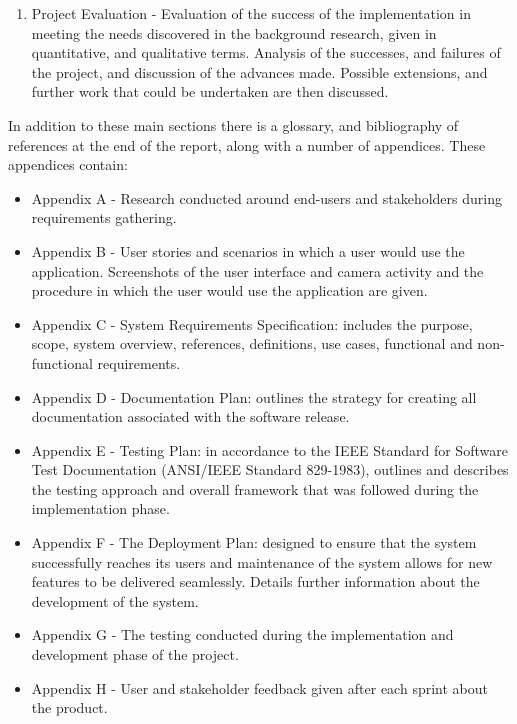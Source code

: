 \begin{enumerate}
	\item Project Evaluation - Evaluation of the success of the implementation in meeting the needs discovered in the background research, given in quantitative, and qualitative terms. Analysis of the successes, and failures of the project, and discussion of the advances made. Possible extensions, and further work that could be undertaken are then discussed.
\end{enumerate}

In addition to these main sections there is a glossary, and bibliography of references at the end of the report, along with a number of appendices. These appendices contain:

\begin{itemize}
	\item Appendix A - Research conducted around end-users and stakeholders during requirements gathering.
	\item Appendix B - User stories and scenarios in which a user would use the application. Screenshots of the user interface and camera activity and the procedure in which the user would use the application are given.
	\item Appendix C - System Requirements Specification: includes the purpose, scope, system overview, references, definitions, use cases, functional and non-functional requirements.
	\item Appendix D - Documentation Plan: outlines the strategy for creating all documentation associated with the software release.
	\item Appendix E - Testing Plan: in accordance to the IEEE Standard for Software Test Documentation (ANSI/IEEE Standard 829-1983), outlines and describes the testing approach and overall framework that was followed during the implementation phase.
	\item Appendix F - The Deployment Plan: designed to ensure that the system successfully reaches its users and maintenance of the system allows for new features to be delivered seamlessly. Details further information about the development of the system.
	\item Appendix G - The testing conducted during the implementation and development phase of the project.
	\item Appendix H - User and stakeholder feedback given after each sprint about the product.
\end{itemize}